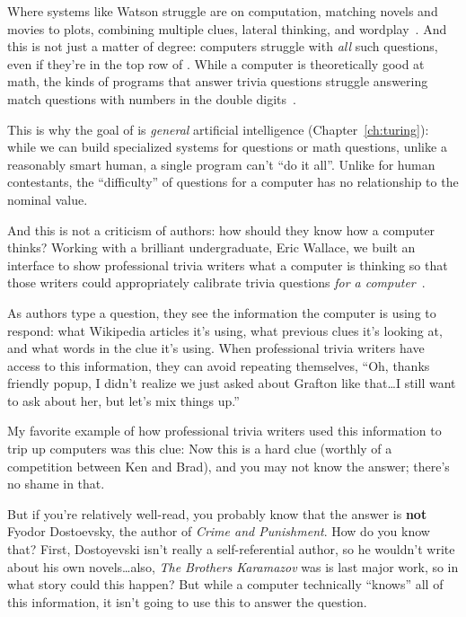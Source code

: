Where systems like Watson struggle are on computation, matching novels
and movies to plots, combining multiple clues, lateral thinking, and
wordplay~\citep{kaushik-18}.
%
And this is not just a matter of degree: computers struggle with \emph{all}
such questions, even if they're in the top row of \jeopardyp{}.
%
While a computer is theoretically good at math, the kinds of programs
that answer trivia questions struggle answering match questions with
numbers in the double digits~\citep{wallace-19:numbers}.

This is why the goal of  is \emph{general} artificial
intelligence (Chapter~\ref{ch:turing}): while we can build specialized
systems for \jeopardy{} questions or math questions, unlike a
reasonably smart human, a single program can't ``do it all''.
%
Unlike for human contestants, the ``difficulty'' of \jeopardy{}
questions for a computer has no relationship to the nominal value.

And this is not a criticism of \jeopardy{} authors: how should they
know how a computer thinks?
%
Working with a brilliant undergraduate, Eric Wallace, we built an
interface to show professional trivia writers what a computer is
thinking so that those writers could appropriately calibrate trivia
questions \emph{for a computer}~\citep{wallace-19}.

As authors type a question, they see the information the computer is
using to respond:
%
what Wikipedia articles it's using,
%
what previous clues it's looking at,
%
and what words in the clue it's using.
%
When professional trivia writers have access to this information, they can
avoid repeating themselves,
%
``Oh, thanks friendly popup, I didn't realize we just asked about
Grafton like that\dots I still want to ask about her, but let's mix
things up.''

My favorite example of how professional trivia writers used this
information to trip up computers was this clue:
%
Now this is a hard clue (worthly of a competition between Ken and
Brad), and you may not know the answer; there's no shame in that.

But if you're relatively well-read, you probably know that the answer
is {\bf not} Fyodor Dostoevsky, the author of \textit{Crime and
  Punishment}.
%
How do you know that?  
%
First, Dostoyevski isn't really a self-referential author, so he
wouldn't write about his own novels\dots also, \textit{The Brothers
  Karamazov} was is last major work, so in what story could this
happen?
%
But while a computer technically ``knows'' all of this information, it
isn't going to use this to answer the question.

